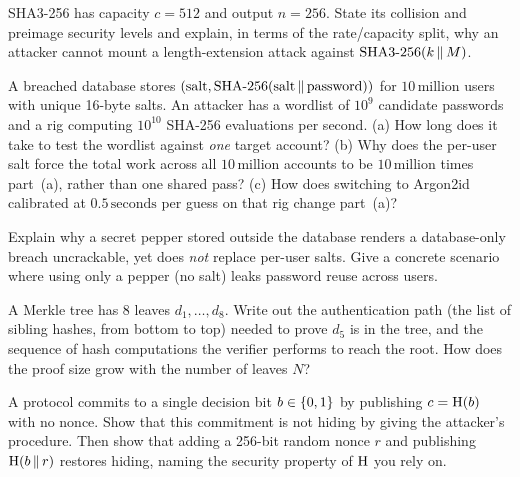 \begin{exercise}
SHA3-256 has capacity $c = 512$ and output $n = 256$. State its collision and preimage security levels and explain, in terms of the rate/capacity split, why an attacker cannot mount a length-extension attack against $\text{SHA3-256}(k \,\|\, M)$.
\end{exercise}

\begin{exercise}
A breached database stores $(\text{salt}, \text{SHA-256}(\text{salt}\,\|\,\text{password}))$ for $10\,\text{million}$ users with unique 16-byte salts. An attacker has a wordlist of $10^{9}$ candidate passwords and a rig computing $10^{10}$ SHA-256 evaluations per second. (a) How long does it take to test the wordlist against \emph{one} target account? (b) Why does the per-user salt force the total work across all $10\,\text{million}$ accounts to be $10\,\text{million}$ times part~(a), rather than one shared pass? (c) How does switching to Argon2id calibrated at $0.5\,\text{seconds}$ per guess on that rig change part~(a)?
\end{exercise}

\begin{exercise}[Pepper]
Explain why a secret pepper stored outside the database renders a database-only breach uncrackable, yet does \emph{not} replace per-user salts. Give a concrete scenario where using only a pepper (no salt) leaks password reuse across users.
\end{exercise}

\begin{exercise}
A Merkle tree has 8 leaves $d_1, \dots, d_8$. Write out the authentication path (the list of sibling hashes, from bottom to top) needed to prove $d_5$ is in the tree, and the sequence of hash computations the verifier performs to reach the root. How does the proof size grow with the number of leaves $N$?
\end{exercise}

\begin{exercise}
A protocol commits to a single decision bit $b \in \{0,1\}$ by publishing $c = \operatorname{H}(b)$ with no nonce. Show that this commitment is not hiding by giving the attacker's procedure. Then show that adding a 256-bit random nonce $r$ and publishing $\operatorname{H}(b \,\|\, r)$ restores hiding, naming the security property of $\operatorname{H}$ you rely on.
\end{exercise}
